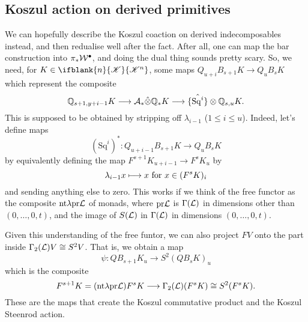 \documentclass[10pt]{article}
\newcommand{\LL}[1]{\ifblank{#1}{\scrK}{\scrK^{#1}}}
\newcommand{\Sq}{\mathrm{Sq}}
\begin{document}
\begin{Koszul Actions}
\pagebreak
\section{Koszul action on derived primitives}
We can hopefully describe the Koszul coaction on derived indecomposables instead, and then redualise well after the fact. After all, one can map the bar construction into $\pi_*\calW^\bullet$, and doing the dual thing sounds pretty scary. So, we need, for $K\in\LL{n}$, some maps $Q_{u+i}B_{s+1}K\to Q_uB_{s}K$ which represent the composite
\[\mathbb{Q}_{s+1,y+i-1}K \to\calA_*\hat\otimes\mathbb{Q}_{*}K\to \{\hat{\Sq^i}\}\otimes\mathbb{Q}_{s,u}K.\]
This is supposed to be obtained by stripping off $\lambda_{i-1}$ ($1\leq i\leq u$). Indeed, let's define maps
\[(\Sq^i)^*:Q_{u+i-1}B_{s+1}K\to Q_{u}B_{s}K\]
by equivalently defining the map $F^{s+1}K_{u+i-1}\to F^{s}K_{u}$ by
\[\lambda_{i-1}x\mapsto x\textup{ for }x\in (F^{s}K)_{i}\]
and sending anything else to zero. This works if we think of the free functor as the composite $\textup{nt$\lambda$}\circ\textup{pr$\calL$}$ of monads, where $\textup{pr$\calL$}$ is $\Gamma(\calL)$ in dimensions other than $(0,\ldots,0,t)$, and the image of $S(\calL)$ in $\Gamma(\calL)$ in dimensions $(0,\ldots,0,t)$.

Given this understanding of the free funtor, we can also project $FV$ onto the part inside $\Gamma_2(\calL)V\cong S^2V$. That is, we obtain a map
\[\psi:QB_{s+1}K_u\to S^2(QB_{s}K)_u\]
which is the composite 
\[F^{s+1}K=(\textup{nt$\lambda$}\circ\textup{pr$\calL$})F^sK \to\Gamma_2(\calL)(F^sK)\cong S^2(F^sK).\]
These are the maps that create the Koszul commutative product and the Koszul Steenrod action.


\end{Koszul Actions}
\end{document}
